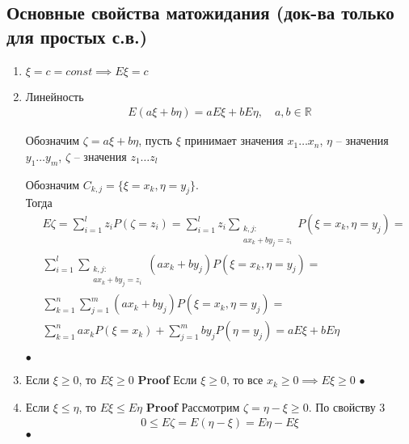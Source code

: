 \documentclass[a4paper]{article}
\theoremstyle{plain}
\theoremstyle{remark}
\theoremstyle{definition}
\renewenvironment{proof}{{\bfseries Proof}}{$\bullet$}
\newcommand{\setR}{\mathbb{R}}
\renewcommand{\leq}{\leqslant}
\renewcommand{\geq}{\geqslant}
\begin{document}
\subsection{Основные свойства матожидания (док-ва только для простых с.в.)}
\begin{enumerate}
  \item $\xi = c = const \implies E\xi = c$
  \item 
    Линейность
    \begin{align*}
      E(a\xi + b\eta) = a E \xi + b E \eta, \quad a, b \in \setR
    \end{align*}

    \begin{proof}
      Обозначим $\zeta = a\xi + b\eta$, пусть $\xi$ принимает значения $x_1 \ldots x_n$, 
      $\eta$ -- значения $y_1 \ldots y_m$, $\zeta$ -- значения $z_1 \ldots z_l$

      Обозначим $C_{k, j} = \{ \xi = x_k, \eta = y_j \}$.\\
      Тогда 
      \begin{align*}
        &E\zeta = \sum_{i = 1}^l z_i P(\zeta = z_i) = \sum_{i = 1}^l z_i 
        \sum_{\substack{k,j:\\ a x_k + b y_j = z_i}} P(\xi = x_k, \eta = y_j) =\\
        &\sum_{i = 1}^l \sum_{\substack{k,j:\\ a x_k + b y_j = z_i}} (a x_k + b y_j) 
        P(\xi = x_k, \eta = y_j) =\\
        &\sum_{k = 1}^n \sum_{j = 1}^m (a x_k + b y_j) P(\xi = x_k, \eta = y_j) =\\
        &\sum_{k = 1}^n a x_k P(\xi = x_k) + \sum_{j = 1}^m b y_j P(\eta = y_j) = a E \xi + b E \eta
      \end{align*}

    \end{proof}

  \item Если $\xi \geq 0$, то $E \xi \geq 0$
    \begin{proof}
      Если $\xi \geq 0$, то все $x_k \geq 0 \implies E \xi \geq 0$
    \end{proof}

  \item Если $\xi \leq \eta$, то $E \xi \leq E \eta$
    \begin{proof}
      Рассмотрим $\zeta = \eta - \xi \geq 0$. По свойству 3\\
        \begin{align*}
          0 \leq E \zeta = E (\eta - \xi) = E \eta - E \xi
        \end{align*}
    \end{proof}
\end{enumerate}
\end{document}
